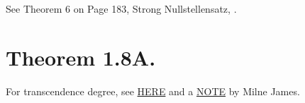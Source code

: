 See Theorem 6 on Page 183, Strong Nullstellensatz, \cite{cox2013ideals}. 

\section{Theorem 1.8A.}

For transcendence degree, see \href{https://en.wikipedia.org/wiki/Transcendental_extension#CITEREFMilne}{HERE} and a \href{https://www.jmilne.org/math/CourseNotes/FT.pdf}{NOTE} by Milne James.